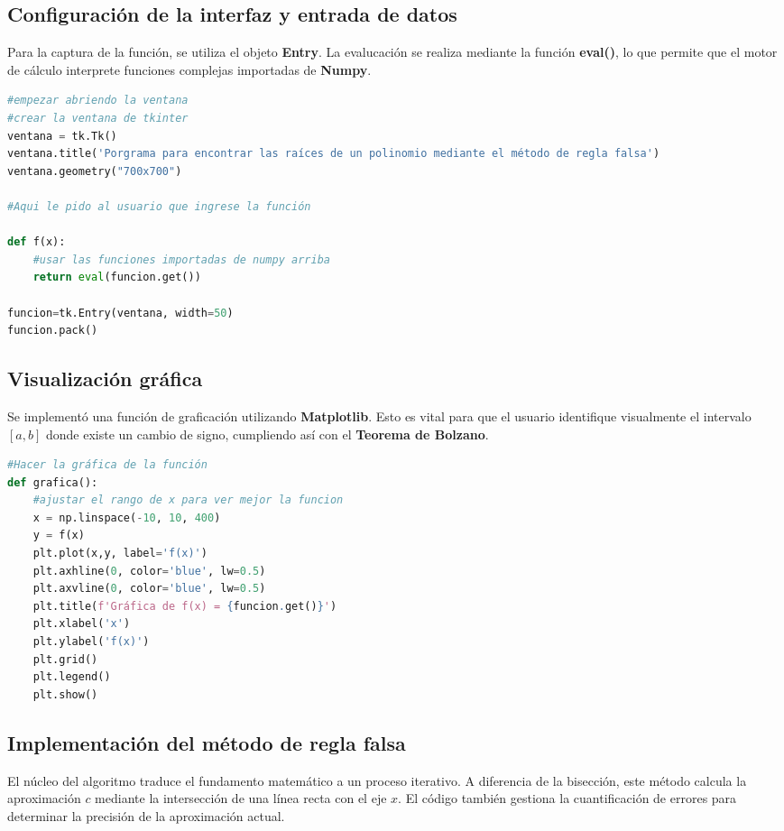 \documentclass{rmf-d}
\begin{document}
\begin{multicols}{2}
\subsection{Configuración de la interfaz y entrada de datos}
Para la captura de la función, se utiliza el objeto \textbf{Entry}. La evalucación se realiza mediante la función \textbf{eval()}, lo que permite que el motor de cálculo interprete funciones complejas importadas de \textbf{Numpy}.

\begin{lstlisting}[language=Python, caption=Configuración de la ventana y captura de función]
#empezar abriendo la ventana 
#crear la ventana de tkinter
ventana = tk.Tk()
ventana.title('Porgrama para encontrar las raíces de un polinomio mediante el método de regla falsa')
ventana.geometry("700x700")

#Aqui le pido al usuario que ingrese la función

def f(x):
    #usar las funciones importadas de numpy arriba
    return eval(funcion.get())

funcion=tk.Entry(ventana, width=50)
funcion.pack()
\end{lstlisting}

\subsection{Visualización gráfica}
Se implementó una función de graficación utilizando \textbf{Matplotlib}. Esto es vital para que el usuario identifique visualmente el intervalo $[a,b]$ donde existe un cambio de signo, cumpliendo así con el \textbf{Teorema de Bolzano}.

\begin{lstlisting}[language=Python, caption=Rutina de graficación con Matplotlib]
#Hacer la gráfica de la función
def grafica():
    #ajustar el rango de x para ver mejor la funcion
    x = np.linspace(-10, 10, 400)
    y = f(x)
    plt.plot(x,y, label='f(x)')
    plt.axhline(0, color='blue', lw=0.5)
    plt.axvline(0, color='blue', lw=0.5)
    plt.title(f'Gráfica de f(x) = {funcion.get()}')
    plt.xlabel('x')
    plt.ylabel('f(x)')
    plt.grid()
    plt.legend()
    plt.show()
\end{lstlisting}

\subsection{Implementación del método de regla falsa}
El núcleo del algoritmo traduce el fundamento matemático a un proceso iterativo. A diferencia de la bisección, este método calcula la aproximación $c$ mediante la intersección de una línea recta con el eje $x$. El código también gestiona la cuantificación de errores para determinar la precisión de la aproximación actual.


\end{multicols}
\end{document}
